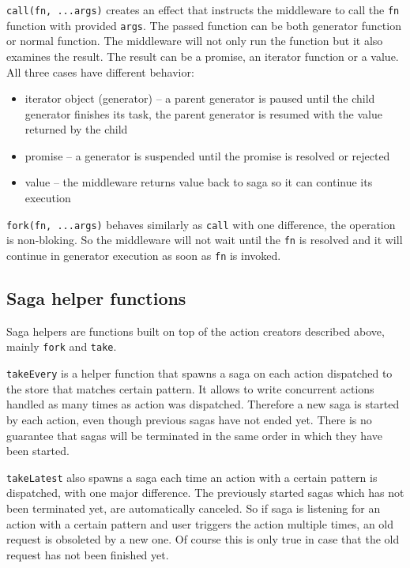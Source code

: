 \texttt{call(fn, ...args)} creates an effect that instructs the middleware to call the \texttt{fn} function with provided \texttt{args}. The passed function can be both generator function or normal function. The middleware will not only run the function but it also examines the result. The result can be a promise, an iterator function or a value. All three cases have different behavior:
\begin{itemize}
\item iterator object (generator) -- a parent generator is paused until the child generator finishes its task, the parent generator is resumed with the value returned by the child
\item promise -- a generator is  suspended until the promise is resolved or rejected
\item value -- the middleware returns value back to saga so it can continue its execution
\end{itemize} 

\texttt{fork(fn, ...args)} behaves similarly as \texttt{call} with one difference, the operation is non-bloking. So the middleware will not wait until the \texttt{fn} is resolved and it will continue in generator execution as soon as \texttt{fn} is invoked.

\subsection{Saga helper functions}
Saga helpers are functions built on top of the action creators described above, mainly \texttt{fork} and \texttt{take}.

\texttt{takeEvery} is a helper function that spawns a saga on each action dispatched to the store that matches certain pattern. It allows to write concurrent actions handled as many times as action was dispatched. Therefore a new saga is started by each action, even though previous sagas have not ended yet. There is no guarantee that sagas will be terminated in the same order in which they have been started.

\texttt{takeLatest} also spawns a saga each time an action with a certain pattern is dispatched, with one major difference. The previously started sagas which has not been terminated yet, are automatically canceled. So if saga is listening for an action with a certain pattern and user triggers the action multiple times, an old request is obsoleted by a new one. Of course this is only true in case that the old request has not been finished yet.

